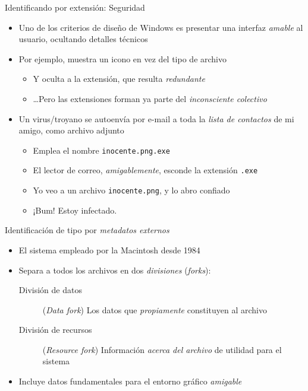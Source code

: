 \documentclass[presentation]{beamer}
\newcommand{\rarrow}{$\rightarrow$\hskip 0.5em}
\begin{document}
\begin{frame}[label={sec:org8127bae},fragile]{Identificando por extensión: Seguridad}
 \begin{itemize}
\item Uno de los criterios de diseño de Windows es presentar una interfaz
\emph{amable} al usuario, ocultando detalles técnicos
\item Por ejemplo, muestra un icono en vez del tipo de archivo
\begin{itemize}
\item Y oculta a la extensión, que resulta \emph{redundante}
\item \ldots{}Pero las extensiones forman ya parte del \emph{inconsciente
colectivo}
\end{itemize}
\item Un virus/troyano se autoenvía por e-mail a toda la \emph{lista de
contactos} de mi amigo, como archivo adjunto
\begin{itemize}
\item Emplea el nombre \texttt{inocente.png.exe}
\item El lector de correo, \emph{amigablemente}, esconde la extensión \texttt{.exe}
\item Yo veo a un archivo \texttt{inocente.png}, y lo abro confiado
\item \alert{¡Bum!} Estoy infectado.
\end{itemize}
\end{itemize}
\end{frame}

\begin{frame}[label={sec:org8c7c202}]{Identificación de tipo por \emph{metadatos externos}}
\begin{itemize}
\item El sistema empleado por la Macintosh desde 1984
\item Separa a todos los archivos en dos \emph{divisiones} (\emph{forks}):
\begin{description}
\item[{División de datos}] (\emph{Data fork}) Los datos que \emph{propiamente}
constituyen al archivo
\item[{División de recursos}] (\emph{Resource fork}) Información \emph{acerca del
archivo} de utilidad para el sistema
\end{description}
\item Incluye datos fundamentales para el entorno gráfico \emph{amigable}
\end{itemize}
\end{frame}
\end{document}
